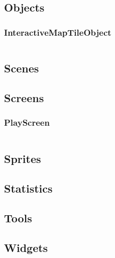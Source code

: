 \documentclass[12p]{article}
\begin{document}
\subsection{Objects}
\subsubsection{InteractiveMapTileObject} \label{InteractiveMapTileObject.java}
\inputminted[linenos,breaklines]{java}{code/Objects/InteractiveMapTileObject.java}

\subsection{Scenes}

\subsection{Screens}
\subsubsection{PlayScreen} \label{PlayScreen.java}
\inputminted[linenos,breaklines]{java}{code/Screens/PlayScreen.java}

\subsection{Sprites}

\subsection{Statistics}

\subsection{Tools}

\subsection{Widgets}

\end{document}
